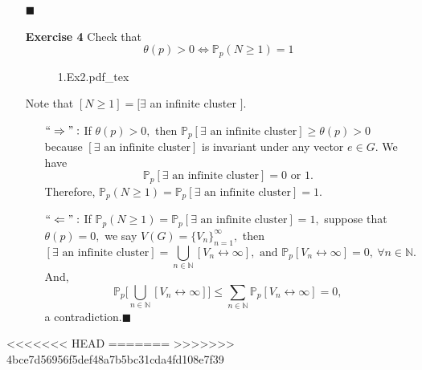 \documentclass[12pt,a4paper]{report}
\theoremstyle{definition}
\newcommand{\SOL}{\fbox{ \tt s\parbox[b][2pt][c]{6pt}{o}\hspace*{-7pt} L:}}
\newcommand{\incfig}[1]{%
{#1.pdf_tex}
}
\begin{document}
\begin{enumerate}
	\hspace*{443pt}$\blacksquare$
	\item[\textbf{Exercise 4}] Check that
	\[
	\theta(p)>0\Leftrightarrow \mathbb{P}_p(N\geq 1)=1
	\]
	\begin{figure}[htp]
	\centering
	\def\svgwidth{8cm}
	\incfig{1.Ex2}
	\end{figure}
	\item[\SOL] Note that $[N\geq 1]=[\exists$ an infinite cluster $].$
	\begin{enumerate}
	    \item[$``\Rightarrow":$] If $\theta(p)>0,$ then $\mathbb{P}_p[\exists\mbox{ an infinite cluster}]\geq\theta(p)>0$ because $[\exists\mbox{ an infinite cluster}]$ is invariant under any vector $e\in G$. We have
	    \[
	   \mathbb{P}_p[\exists\mbox{ an infinite cluster}]=0\mbox{ or }1.
	    \]
	    Therefore, $\mathbb{P}_p(N\geq 1)=\mathbb{P}_p[\exists\mbox{ an infinite cluster}]=1.$
	    \item[$``\Leftarrow":$] If $\mathbb{P}_p(N\geq 1)=\mathbb{P}_p[\exists\mbox{ an infinite cluster}]=1,$ suppose that $\theta(p)=0,$ we say $V(G)=\{V_n\}_{n=1}^\infty,$ then
	    \[
	    [\exists\mbox{ an infinite cluster}]=\bigcup_{n\in\mathbb{N}}[V_n\leftrightarrow\infty],\mbox{ and } \mathbb{P}_p[V_n\leftrightarrow\infty]=0,\ \forall n\in\mathbb{N}.
	    \]
	    And,
	    \[
	    \mathbb{P}_p\Big[\bigcup_{n\in\mathbb{N}}[V_n\leftrightarrow\infty]\Big]\leq \sum_{n\in\mathbb{N}}\mathbb{P}_p[V_n\leftrightarrow\infty]=0,
	    \]
	    a contradiction.\qquad $\blacksquare$
	\end{enumerate}
\end{enumerate}

<<<<<<< HEAD
=======
>>>>>>> 4bce7d56956f5def48a7b5bc31cda4fd108e7f39
\newpage
\end{document}
